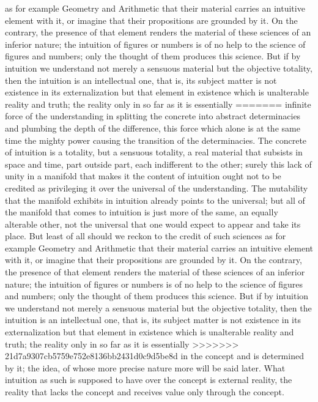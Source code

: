 as for example Geometry and Arithmetic
that their material carries an intuitive element with it, 
or imagine that their propositions are grounded by it. 
On the contrary, the presence of that element renders
the material of these sciences of an inferior nature; 
the intuition of figures or numbers is
of no help to the science of figures and numbers;
only the thought of them produces this science.
But if by intuition we understand 
not merely a sensuous material
but the objective totality,
then the intuition is an intellectual one, that is,
its subject matter is not existence in its externalization 
but that element in existence which is 
unalterable reality and truth;  
the reality only in so far as it is essentially 
=======
infinite force of the understanding
in splitting the concrete into abstract determinacies
and plumbing the depth of the difference,
this force which alone is at the same time
the mighty power causing the transition of the determinacies.
The concrete of intuition is a totality,
but a sensuous totality,
a real material that subsists in space and time,
part outside part, each indifferent to the other;
surely this lack of unity in a manifold that
makes it the content of intuition ought not to be credited
as privileging it over the universal of the understanding.
The mutability that the manifold exhibits
in intuition already points to the universal;
but all of the manifold that comes to intuition is
just more of the same, an equally alterable other,
not the universal that one would expect to appear and take its place.
But least of all should we reckon to the credit of such sciences
as for example Geometry and Arithmetic
that their material carries an intuitive element with it,
or imagine that their propositions are grounded by it.
On the contrary, the presence of that element renders
the material of these sciences of an inferior nature;
the intuition of figures or numbers is
of no help to the science of figures and numbers;
only the thought of them produces this science.
But if by intuition we understand
not merely a sensuous material
but the objective totality,
then the intuition is an intellectual one, that is,
its subject matter is not existence in its externalization
but that element in existence which is
unalterable reality and truth;
the reality only in so far as it is essentially
>>>>>>> 21d7a9307cb5759e752e8136bb2431d0c9d5be8d
in the concept and is determined by it;
the idea, of whose more precise nature more will be said later.
What intuition as such is supposed to have
over the concept is external reality,
the reality that lacks the concept
and receives value only through the concept.

